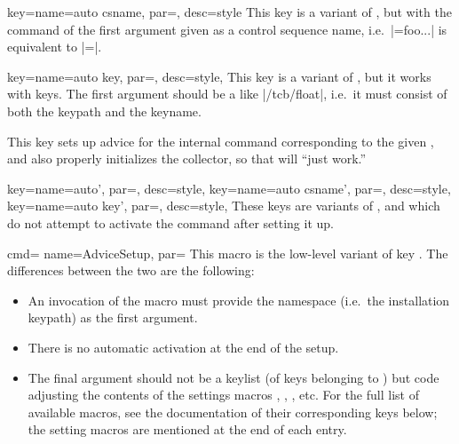 \documentclass[a4paper,11pt]{article}
\begin{document}
\begin{doc}{
    key={name=auto csname, par=, desc=style}
  }
  This key is a variant of , but with the command of the first
  argument given as a control sequence name, i.e.\ |={foo}{...}| is equivalent to |=|.
\end{doc}

\begin{doc}{
    key={name=auto key, par=, desc=style},
  }
  This key is a variant of , but it works with  keys.
  The first argument should be a  like |/tcb/float|, i.e.\ it
  must consist of both the keypath and the keyname.

  This key sets up advice for the internal command corresponding to the given
  , and also properly initializes the collector, so that
   will ``just work.''
\end{doc}

\begin{doc}{
    key={name=auto', par=, desc=style},
    key={name=auto csname', par=, desc=style},
    key={name=auto key', par=, desc=style},
  }
  These keys are variants of ,  and
   which do not attempt to activate the command after setting
  it up.
\end{doc}

\begin{doc}{
    cmd={
      name=AdviceSetup,
      par=
    }}
  This macro is the low-level variant of key .  The differences
  between the two are the following:
  \begin{itemize}
  \item An invocation of the macro must provide the namespace (i.e.\ the
    installation keypath) as the first argument.
  \item There is no automatic activation at the end of the setup.
  \item The final argument should not be a keylist (of keys belonging to
    ) but  code adjusting the contents of the
    settings macros , ,
    , etc.  For the full list of available macros, see
    the documentation of their corresponding keys below; the setting macros are
    mentioned at the end of each entry.
  \end{itemize}
\end{doc}
\end{document}

